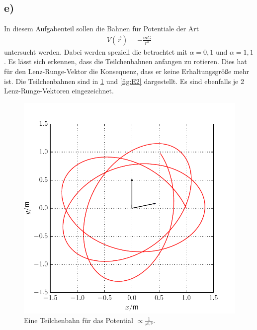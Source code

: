 \subsection*{e)}
In diesem Aufgabenteil sollen die Bahnen für Potentiale der Art
\begin{align}
	V(\vec{r})=-\frac{mG}{r^\alpha}
\end{align}
untersucht werden. 
Dabei werden speziell die betrachtet mit $\alpha=0,1$ und $\alpha=1,1$.
Es lässt sich erkennen, dass die Teilchenbahnen anfangen zu rotieren.
Dies hat für den Lenz-Runge-Vektor die Konsequenz, dass er keine Erhaltungsgröße mehr ist.
Die Teilchenbahnen sind in \cref{fig:E1} und \cref{fig:E2} dargestellt. Es sind ebenfalls je 2 Lenz-Runge-Vektoren eingezeichnet.

\begin{figure}[H]
	\centering
	\includegraphics[width = \textwidth]{../Plots/Plot_4_E_1.pdf}
	\caption{Eine Teilchenbahn für das Potential $\propto\frac{1}{r^{0,9}}$.\label{fig:E1}}
\end{figure}

